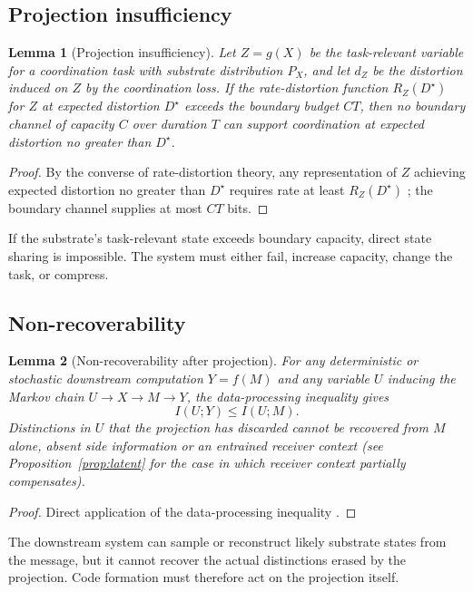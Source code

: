 \documentclass[12pt]{article}
\newtheorem{lemma}{Lemma}
\theoremstyle{definition}
\newcommand{\I}{I}
\newcommand{\C}{C}
\begin{document}
\subsection{Projection insufficiency}

\begin{lemma}[Projection insufficiency]
\label{lem:projection}
Let $Z=g(X)$ be the task-relevant variable for a coordination task with substrate distribution $P_X$, and let $d_Z$ be the distortion induced on $Z$ by the coordination loss. If the rate-distortion function $R_Z(D^\star)$ for $Z$ at expected distortion $D^\star$ exceeds the boundary budget $\C T$, then no boundary channel of capacity $\C$ over duration $T$ can support coordination at expected distortion no greater than $D^\star$.
\end{lemma}

\begin{proof}
By the converse of rate-distortion theory, any representation of $Z$ achieving expected distortion no greater than $D^\star$ requires rate at least $R_Z(D^\star)$ \citep{coverthomas2006}; the boundary channel supplies at most $\C T$ bits.
\end{proof}

If the substrate's task-relevant state exceeds boundary capacity, direct state sharing is impossible. The system must either fail, increase capacity, change the task, or compress.

\subsection{Non-recoverability}

\begin{lemma}[Non-recoverability after projection]
\label{lem:nonrecoverability}
For any deterministic or stochastic downstream computation $Y=f(M)$ and any variable $U$ inducing the Markov chain $U \to X \to M \to Y$, the data-processing inequality gives
\[
\I(U;Y) \leq \I(U;M).
\]
Distinctions in $U$ that the projection has discarded cannot be recovered from $M$ alone, absent side information or an entrained receiver context (see Proposition~\ref{prop:latent} for the case in which receiver context partially compensates).
\end{lemma}

\begin{proof}
Direct application of the data-processing inequality \citep{coverthomas2006}.
\end{proof}

The downstream system can sample or reconstruct likely substrate states from the message, but it cannot recover the actual distinctions erased by the projection. Code formation must therefore act on the projection itself.
\end{document}
